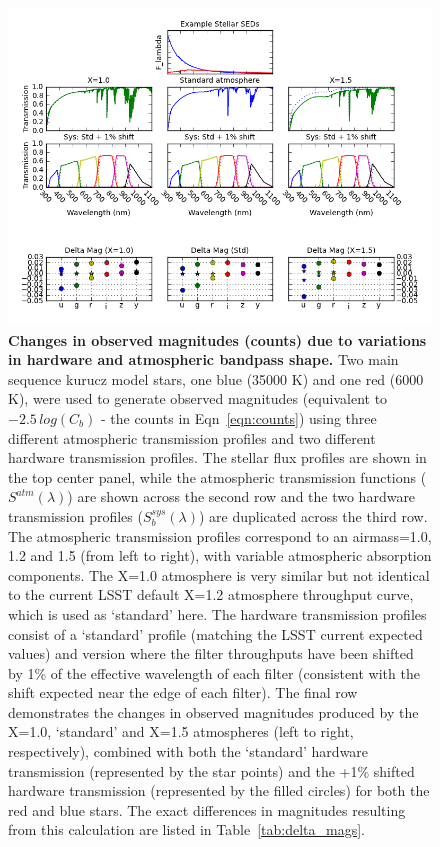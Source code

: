\documentclass[12pt,preprint]{aastex}
\begin{document}
\begin{figure}[htbp]
\includegraphics[width=6in]{delta_mags}
\caption{ {\small {\bf Changes in observed magnitudes (counts) due to variations in
hardware and atmospheric bandpass shape.} Two main sequence kurucz model
stars, one blue (35000 K) and one red (6000 K), were used to generate
observed magnitudes (equivalent to $-2.5\, log(C_b)$ - the counts in
Eqn~\ref{eqn:counts}) using three different atmospheric transmission
profiles and two different hardware transmission profiles. The stellar
flux profiles are shown in the top center panel, while the atmospheric
transmission functions ($S^{atm}(\lambda)$) are shown across the
second row and the two hardware transmission profiles
($S_b^{sys}(\lambda)$) are duplicated across the third row. The
atmospheric transmission profiles correspond to an airmass=1.0, 1.2
and 1.5 (from left to right), with variable atmospheric absorption
components. The X=1.0 atmosphere is very similar but not
identical to the current LSST default X=1.2 atmosphere throughput
curve, which is used as `standard' here. The hardware transmission
profiles consist of a `standard' profile (matching the LSST current
expected values) and version where the filter throughputs have been
shifted by 1\% of the effective wavelength of each filter (consistent
with the shift expected near the edge of each filter). The final row
demonstrates the changes in observed magnitudes produced by the X=1.0,
`standard' and X=1.5 atmospheres (left to right, respectively),
combined with both the `standard' hardware transmission (represented by
the star points) and the +1\% shifted hardware transmission (represented
by the filled circles) for both the red and blue stars. The exact
differences in magnitudes resulting from this calculation are listed in
Table~\ref{tab:delta_mags}. }
\label{fig:delta_mags} }
\end{figure}
\end{document}
